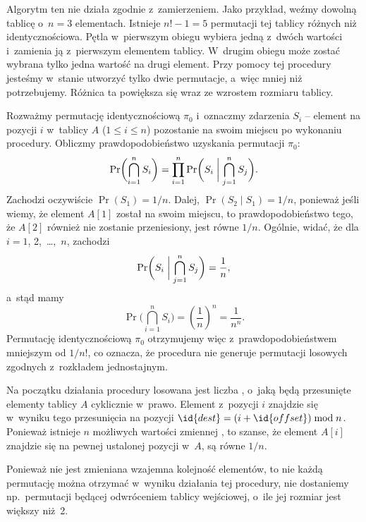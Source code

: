 \exercise %

\noindent Algorytm ten nie działa zgodnie z~zamierzeniem. Jako przykład, weźmy dowolną tablicę o~$n=3$ elementach. Istnieje $n!-1=5$ permutacji tej tablicy różnych niż identycznościowa. Pętla  w~pierwszym obiegu wybiera jedną z~dwóch wartości i~zamienia ją z~pierwszym elementem tablicy. W~drugim obiegu może zostać wybrana tylko jedna wartość na drugi element. Przy pomocy tej procedury jesteśmy w~stanie utworzyć tylko dwie permutacje, a~więc mniej niż potrzebujemy. Różnica ta powiększa się wraz ze wzrostem rozmiaru tablicy.

\exercise %
Rozważmy permutację identycznościową $\pi_0$ i~oznaczmy zdarzenia $S_i$ -- element na pozycji $i$ w~tablicy $A$ ($1\le i\le n$) pozostanie na swoim miejscu po wykonaniu procedury. Obliczmy prawdopodobieństwo uzyskania permutacji $\pi_0$:
\[
	\Pr\biggl(\bigcap_{i=1}^nS_i\biggr) = \prod_{i=1}^n\Pr\biggl(S_i\biggm|\bigcap_{j=1}^nS_j\biggr).
\]
Zachodzi oczywiście $\Pr(S_1)=1/n$. Dalej, $\Pr(S_2\mid S_1)=1/n$, ponieważ jeśli wiemy, że element $A[1]$ został na swoim miejscu, to prawdopodobieństwo tego, że $A[2]$ również nie zostanie przeniesiony, jest równe $1/n$. Ogólnie, widać, że dla $i=1$, 2,~\dots,~$n$, zachodzi
\[
	\Pr\biggl(S_i\biggm|\bigcap_{j=1}^nS_j\biggr) = \frac{1}{n},
\]
a~stąd mamy
\[
	\Pr\biggl(\bigcap_{i=1}^nS_i\biggr) = \left(\frac{1}{n}\right)^n = \frac{1}{n^n}.
\]
Permutację identycznościową $\pi_0$ otrzymujemy więc z~prawdopodobieństwem mniejszym od $1/n!$, co oznacza, że procedura  nie generuje permutacji losowych zgodnych z~rozkładem jednostajnym.

\exercise %
Na początku działania procedury losowana jest liczba , o~jaką będą przesunięte elementy tablicy $A$ cyklicznie w~prawo. Element z~pozycji $i$ znajdzie się w~wyniku tego przesunięcia na pozycji $\id{dest}=(i+\id{offset})\bmod n$. Ponieważ istnieje $n$ możliwych wartości zmiennej , to szanse, że element $A[i]$ znajdzie się na pewnej ustalonej pozycji w~$A$, są równe $1/n$.

Ponieważ nie jest zmieniana wzajemna kolejność elementów, to nie każdą permutację można otrzymać w~wyniku działania tej procedury, nie dostaniemy np.\ permutacji będącej odwróceniem tablicy wejściowej, o~ile jej rozmiar jest większy niż~2.

